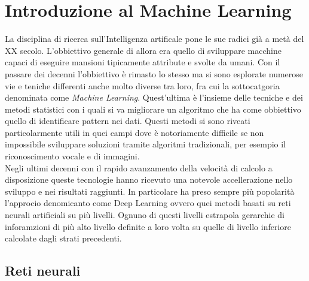 \documentclass[12pt,a4paper,openright,twoside]{report}
\begin{document}
\chapter{Introduzione al Machine Learning}                %
\lhead[\fancyplain{}{\bfseries\thepage}]{\fancyplain{}{\bfseries\rightmark}}
La disciplina di ricerca sull'Intelligenza artificale pone le sue radici già a metà del XX secolo. L'obbiettivo generale di allora era quello di sviluppare macchine capaci di eseguire mansioni tipicamente attribute e svolte da umani. 
Con il passare dei decenni l'obbiettivo è rimasto lo stesso ma si sono esplorate numerose vie e teniche differenti anche molto diverse tra loro, fra cui la sottocatgoria denominata come \emph{Machine Learning}. Quest'ultima è l'insieme delle tecniche e dei metodi statistici con i quali si va migliorare un algoritmo che ha come obbiettivo quello di identificare pattern nei dati. 
Questi metodi si sono riveati particolarmente utili in quei campi dove è notoriamente difficile se non impossibile sviluppare soluzioni tramite algoritmi tradizionali, per esempio il riconoscimento vocale e di immagini.\\
Negli ultimi decenni con il rapido avanzamento della velocità di calcolo a disposizione queste tecnologie hanno ricevuto una notevole accellerazione nello sviluppo e nei risultati raggiunti. 
In particolare ha preso sempre più popolarità l'approcio denomicanto come Deep Learning ovvero quei metodi basati su reti neurali artificiali su più livelli. Ognuno di questi livelli estrapola gerarchie di inforamzioni di più alto livello definite a loro volta su quelle di livello inferiore calcolate dagli strati precedenti.
\section{Reti neurali}
\end{document}
